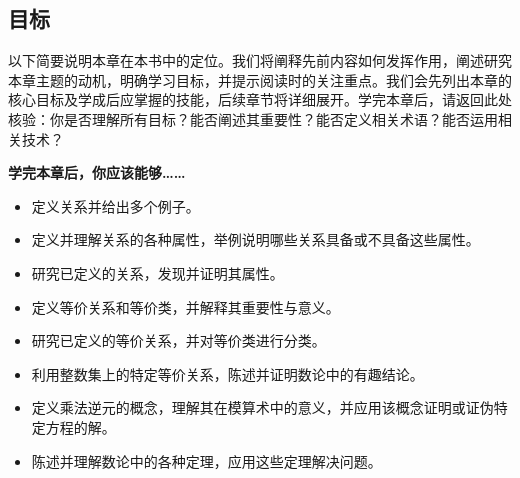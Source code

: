 
\subsection{目标}

以下简要说明本章在本书中的定位。我们将阐释先前内容如何发挥作用，阐述研究本章主题的动机，明确学习目标，并提示阅读时的关注重点。我们会先列出本章的核心目标及学成后应掌握的技能，后续章节将详细展开。学完本章后，请返回此处核验：你是否理解所有目标？能否阐述其重要性？能否定义相关术语？能否运用相关技术？

\textbf{学完本章后，你应该能够……}

\begin{itemize}
    \item 定义关系并给出多个例子。
    \item 定义并理解关系的各种属性，举例说明哪些关系具备或不具备这些属性。
    \item 研究已定义的关系，发现并证明其属性。
    \item 定义等价关系和等价类，并解释其重要性与意义。
    \item 研究已定义的等价关系，并对等价类进行分类。
    \item 利用整数集上的特定等价关系，陈述并证明数论中的有趣结论。
    \item 定义乘法逆元的概念，理解其在模算术中的意义，并应用该概念证明或证伪特定方程的解。
    \item 陈述并理解数论中的各种定理，应用这些定理解决问题。
\end{itemize}